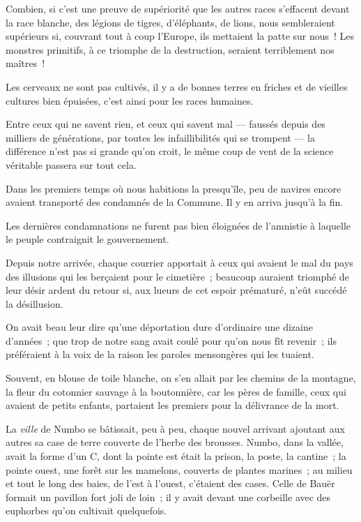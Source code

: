 \documentclass[french,twoside]{book} %
\begin{document}
Combien, si c’est une preuve de supériorité que les autres races s’effacent devant la race blanche, des légions de tigres, d’éléphants, de lions, nous sembleraient supérieurs si, couvrant tout à coup l’Europe, ils mettaient la patte sur nous ! Les monstres primitifs, à ce triomphe de la destruction, seraient terriblement nos maîtres !\par
Les cerveaux ne sont pas cultivés, il y a de bonnes terres en friches et de vieilles cultures bien épuisées, c’est ainsi pour les races humaines.\par
Entre ceux qui ne savent rien, et ceux qui savent mal — faussés depuis des milliers de générations, par toutes les infaillibilités qui se trompent — la  différence n’est pas si grande qu’on croit, le même coup de vent de la science véritable passera sur tout cela.\par
Dans les premiers temps où nous habitions la presqu’île, peu de navires encore avaient transporté des condamnés de la Commune. Il y en arriva jusqu’à la fin.\par
Les dernières condamnations ne furent pas bien éloignées de l’amnistie à laquelle le peuple contraignit le gouvernement.\par
Depuis notre arrivée, chaque courrier apportait à ceux qui avaient le mal du pays des illusions qui les berçaient pour le cimetière ; beaucoup auraient triomphé de leur désir ardent du retour si, aux lueurs de cet espoir prématuré, n’eût succédé la désillusion.\par
On avait beau leur dire qu’une déportation dure d’ordinaire une dizaine d’années ; que trop de notre sang avait coulé pour qu’on nous fît revenir ; ils préféraient à la voix de la raison les paroles mensongères qui les tuaient.\par
Souvent, en blouse de toile blanche, on s’en allait par les chemins de la montagne, la fleur du cotonnier sauvage à la boutonnière, car les pères de famille, ceux qui avaient de petits enfants, partaient les premiers pour la délivrance de la mort.\par
 La \emph{ville} de Numbo se bâtissait, peu à peu, chaque nouvel arrivant ajoutant aux autres sa case de terre couverte de l’herbe des brousses. Numbo, dans la vallée, avait la forme d’un C, dont la pointe est était la prison, la poste, la cantine ; la pointe ouest, une forêt sur les mamelons, couverts de plantes marines ; au milieu et tout le long des baies, de l’est à l’ouest, c’étaient des cases. Celle de Bauër formait un pavillon fort joli de loin ; il y avait devant une corbeille avec des euphorbes qu’on cultivait quelquefois.\par
\end{document}
